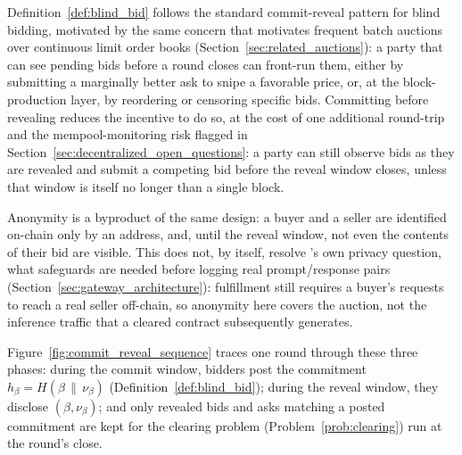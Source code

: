 Definition~\ref{def:blind_bid} follows the standard commit-reveal pattern
for blind bidding, motivated by the same concern that motivates frequent
batch auctions over continuous limit order books
(Section~\ref{sec:related_auctions}): a party that can see pending
bids before a round closes can front-run them, either by submitting a
marginally better ask to snipe a favorable price, or, at the
block-production layer, by reordering or censoring specific bids.
Committing before revealing reduces the incentive to do so, at the cost of
one additional round-trip and the mempool-monitoring risk flagged in
Section~\ref{sec:decentralized_open_questions}: a party can still observe
bids as they are revealed and submit a competing bid before the reveal
window closes, unless that window is itself no longer than a single
block.

Anonymity is a byproduct of the same design: a buyer and a seller are
identified on-chain only by an address, and, until the reveal window, not
even the contents of their bid are visible. This does not, by itself,
resolve \NoesisServer's own privacy question, what safeguards are needed
before logging real prompt/response pairs (Section~\ref{sec:gateway_architecture}):
fulfillment still requires a buyer's requests to reach a real seller
off-chain, so anonymity here covers the auction, not the inference traffic
that a cleared contract subsequently generates.

Figure~\ref{fig:commit_reveal_sequence} traces one round through these
three phases: during the commit window, bidders post the commitment
$h_\beta = H(\beta \,\|\, \nu_\beta)$ (Definition~\ref{def:blind_bid});
during the reveal window, they disclose $(\beta, \nu_\beta)$; and only
revealed bids and asks matching a posted commitment are kept for the
clearing problem (Problem~\ref{prob:clearing}) run at the round's close.

